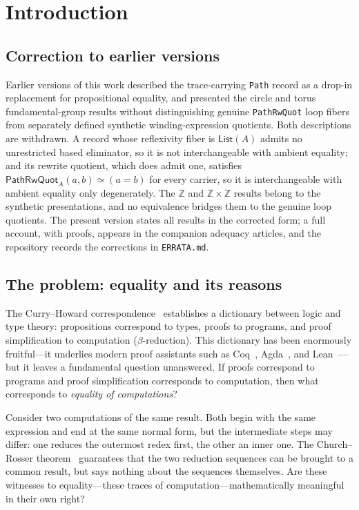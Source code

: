 \documentclass[manuscript]{BSLstyle}
\newcommand{\Z}{\mathbb{Z}}
\begin{document}
\section{Introduction}\label{sec:intro}

\subsection*{Correction to earlier versions}

Earlier versions of this work described the trace-carrying \texttt{Path} record
as a drop-in replacement for propositional equality, and presented the circle
and torus fundamental-group results without distinguishing genuine
\texttt{PathRwQuot} loop fibers from separately defined synthetic
winding-expression quotients.  Both descriptions are withdrawn.  A record whose
reflexivity fiber is $\mathsf{List}(A)$ admits no unrestricted based
eliminator, so it is not interchangeable with ambient equality; and its rewrite
quotient, which does admit one, satisfies
$\mathsf{PathRwQuot}_A(a,b)\simeq(a=b)$ for every carrier, so it is
interchangeable with ambient equality only degenerately.  The
$\Z$ and $\Z \times \Z$ results belong to the synthetic
presentations, and no equivalence bridges them to the genuine loop quotients.
The present version states all results in the corrected form; a full account,
with proofs, appears in the companion adequacy articles, and the repository
records the corrections in \texttt{ERRATA.md}.

\subsection{The problem: equality and its reasons}

The Curry--Howard correspondence~\cite{Curry34,Howard80} establishes
a dictionary between logic and type theory: propositions correspond to
types, proofs to programs, and proof simplification to computation
($\beta$-reduction).  This dictionary has been enormously fruitful---it
underlies modern proof assistants such as Coq~\cite{Coq}, Agda~\cite{Agda},
and Lean~\cite{deMoura2021}---but it leaves a fundamental question
unanswered.  If proofs correspond to programs and proof simplification
corresponds to computation, then what corresponds to \emph{equality of
computations}?

Consider two computations of the same result.  Both begin with the same
expression and end at the same normal form, but the intermediate steps may
differ: one reduces the outermost redex first, the other an inner one.
The Church--Rosser theorem~\cite{ChurchRosser36} guarantees that the two
reduction sequences can be brought to a common result, but says nothing
about the sequences themselves.  Are these witnesses to equality---these
traces of computation---mathematically meaningful in their own right?
\end{document}
